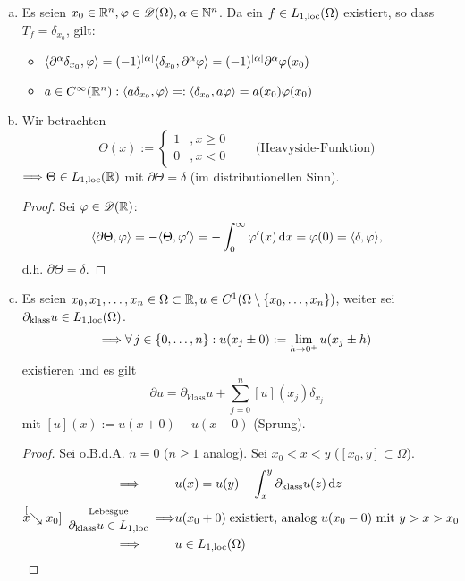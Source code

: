 \begin{bsp}
  \begin{enumerate}[(a)]
  \item Es seien $x_0\in\mathbb{R}^n, \varphi\in\mathscr{D}(\Omega),\alpha\in\mathbb{N}^n$. Da ein $f \in L_{1,\scriptsize{\textnormal{loc}}} (\Omega)$ existiert, so dass $T_f = \delta_{x_0}$, gilt:
    \begin{itemize}
    \item $\langle\partial^\alpha\delta_{x_0},\varphi\rangle=(-1)^{\lvert \alpha\rvert}\langle\delta_{x_0},\partial^\alpha\varphi\rangle=(-1)^{\lvert \alpha\rvert}\partial^\alpha\varphi(x_0)$
    \item $a\in C^\infty(\mathbb{R}^n):\langle a\delta_{x_0},\varphi\rangle=:\langle\delta_{x_0},a\varphi\rangle=a(x_0)\varphi(x_0)$
    \end{itemize}
  \item Wir betrachten
    \[
    \Theta(x):=
    \begin{cases}
      1&,x\geq0 \\
      0&,x<0
    \end{cases}
    \qquad\text{(Heavyside-Funktion)}
    \]
    $\Longrightarrow\Theta\in L_{1,\scriptsize{\textnormal{loc}}}(\mathbb{R})$ mit $\partial\Theta=\delta$ (im distributionellen Sinn).
    \begin{proof}
      Sei $\varphi\in\mathscr{D}(\mathbb{R})$:
      \[
      \langle\partial\Theta,\varphi\rangle=-\langle\Theta,\varphi'\rangle
      =-\int_0^\infty\varphi'(x)\,\mathrm{d} x=\varphi(0)
      =\langle\delta,\varphi\rangle,
      \]
      d.h. $\partial\Theta=\delta$.
    \end{proof}
  \item Es seien $x_0,x_1,\ldots,x_n\in\Omega\subset\mathbb{R}, u\in C^1(\Omega\setminus\{x_0,\ldots,x_n\})$, weiter sei $\partial_{\text{klass}}u\in L_{1,\scriptsize{\textnormal{loc}}}(\Omega)$.
    \begin{align*}
    \Longrightarrow \forall\, j\in\{0,\ldots,n\}: u(x_j\pm 0):=\lim_{h\rightarrow 0^+}u(x_j\pm h)  
    \end{align*}
    existieren und es gilt
    \[
    	\partial u=\partial_{\text{klass}}u + \sum\limits_{j=0}^n[u](x_j)\delta_{x_j}
    \]
     mit $[u](x):=u(x+0)-u(x-0)$ (Sprung).

    \begin{proof}
      Sei o.B.d.A. $n=0$ ($n\geq 1$ analog).
 Sei $x_0<x<y$ ($[x_0,y]\subset\Omega$).
      \begin{align*}
        \Longrightarrow \! \quad \qquad& u(x)=u(y)-\int_x^y\partial_{\text{klass}} u(z)\,\mathrm{d} z \\
        \stackrel[x\searrow x_0]
        {\begin{array}{c}
            \scriptsize  \text{Lebesgue} \\
             \scriptsize \partial_{\text{klass}}u\in L_{1,\scriptsize{\textnormal{loc}}}\end{array}}{\Longrightarrow} 
        & u(x_0+0)\;\text{existiert, analog } 
        u(x_0-0) \text{ mit } y > x > x_0\\
        \Longrightarrow \! \quad \qquad &  u\in L_{1,\scriptsize{\textnormal{loc}}}(\Omega)
      \end{align*}
      

\end{proof}
\end{enumerate}
\end{bsp}
